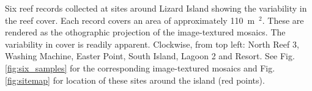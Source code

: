 \label{fig:reef_record_example_bathy} Six reef records collected at sites around Lizard Island showing the variability in the reef cover. Each record covers an area of approximately 110~m~$^2$. These are rendered as the othographic projection of the image-textured mosaics. The variability in cover is readily apparent. Clockwise, from top left: North Reef 3, Washing Machine, Easter Point, South Island, Lagoon 2 and Resort. See Fig. \ref{fig:six_samples} for the corresponding image-textured mosaics and Fig. \ref{fig:sitemap} for location of these sites around the island (red points).